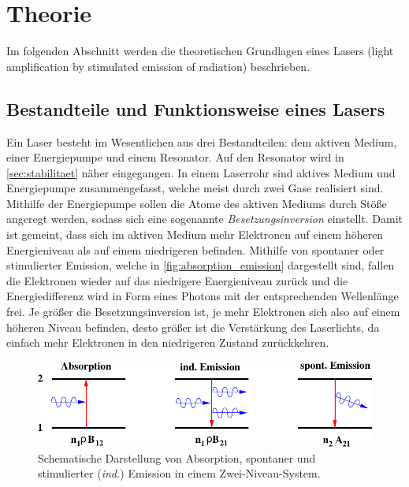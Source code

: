 \section{Theorie}
\label{sec:theorie}

    Im folgenden Abschnitt werden die theoretischen Grundlagen eines Lasers (light amplification by stimulated emission of radiation) beschrieben.

\subsection{Bestandteile und Funktionsweise eines Lasers}

    Ein Laser besteht im Wesentlichen aus drei Bestandteilen:
    dem aktiven Medium, einer Energiepumpe und einem Resonator.
    Auf den Resonator wird in \autoref{sec:stabilitaet} näher eingegangen.
    In einem Laserrohr sind aktives Medium und Energiepumpe zusammengefasst,
    welche meist durch zwei Gase realisiert sind.
    Mithilfe der Energiepumpe sollen die Atome des aktiven Mediums durch Stöße angeregt werden,
    sodass sich eine sogenannte \textit{Besetzungsinversion} einstellt.
    Damit ist gemeint,
    dass sich im aktiven Medium mehr Elektronen auf einem höheren Energieniveau als auf einem niedrigeren befinden.
    Mithilfe von spontaner oder stimulierter Emission,
    welche in \autoref{fig:absorption_emission} dargestellt sind,
    fallen die Elektronen wieder auf das niedrigere Energieniveau zurück
    und die Energiedifferenz wird in Form eines Photons mit der entsprechenden Wellenlänge frei.
    Je größer die Besetzungsinversion ist,
    je mehr Elektronen sich also auf einem höheren Niveau befinden,
    desto größer ist die Verstärkung des Laserlichts,
    da einfach mehr Elektronen in den niedrigeren Zustand zurückkehren.
    \begin{figure}[H]
       \centering
       \includegraphics[width=\textwidth]{content/img/Altanleitung/Abb_1.pdf}
       \caption{Schematische Darstellung von Absorption, spontaner und stimulierter (\textit{ind.}) Emission in einem Zwei-Niveau-System.}
       \label{fig:absorption_emission}
    \end{figure}
